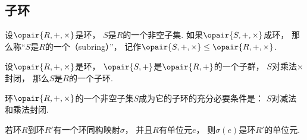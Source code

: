 \subsection{子环}
\begin{definition}
设\(\opair{R,+,\times}\)是环，
\(S\)是\(R\)的一个非空子集.
如果\(\opair{S,+,\times}\)成环，
那么称“\(S\)是\(R\)的一个（subring）”，
记作\(\opair{S,+,\times}\AlgebraSubstructure\opair{R,+,\times}\).
\end{definition}

\begin{proposition}
设\(\opair{R,+,\times}\)是环，
\(\opair{S,+}\)是\(\opair{R,+}\)的一个子群，
\(S\)对乘法\(\times\)封闭，
那么\(S\)是\(R\)的一个子环.
\end{proposition}

\begin{proposition}
环\(\opair{R,+,\times}\)的一个非空子集\(S\)成为它的子环的充分必要条件是：
\(S\)对减法和乘法封闭.
\end{proposition}

\begin{proposition}
若环\(R\)到环\(R'\)有一个环同构映射\(\sigma\)，
并且\(R\)有单位元\(e\)，
则\(\sigma(e)\)是环\(R'\)的单位元.
\end{proposition}
